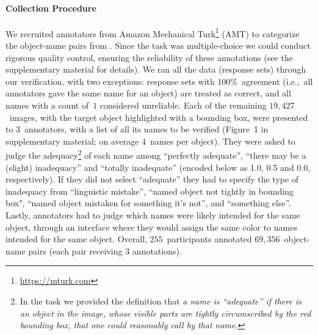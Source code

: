 \paragraph{Collection Procedure}
\label{sect:mn_verification}

We recruited annotators from Amazon Mechanical Turk\footnote{
	\url{https://mturk.com}
} (AMT) to categorize the object-name pairs from \mn.
Since the task was multiple-choice we could conduct rigorous quality control, ensuring the reliability of these annotations (see the supplementary material for details).
We ran all the \mn data (response sets) through our verification, with two exceptions: 
response sets with $100$\%~agreement (i.e.,~all annotators gave the same name for an object) are treated as correct, and all names with a count of~$1$ considered unreliable.
Each of the remaining $19,427$~images, with the target object highlighted with a bounding box, were presented to $3$~annotators, with a list of all its names to be verified (Figure~1 in supplementary material; on average $4$~names per object).
They were asked to judge the adequacy\footnote{
	In the task we provided the definition that \textit{a name is ``adequate'' if there is an object in the image, whose visible parts are tightly circumscribed by the red bounding box, that one could reasonably call by that name}.
} of each name among ``perfectly adequate'', ``there may be a (slight) inadequacy'' and ``totally inadequate'' (encoded below as 1.0, 0.5 and 0.0, respectively).
If they did not select ``adequate'' they had to specify the type of inadequacy from ``linguistic mistake'', ``named object not tightly in bounding box",  ``named object mistaken for something it's not'', and ``something else''.
Lastly, annotators had to judge which names were likely intended for the same object, through an interface where they would assign the same color to names intended for the same object.
Overall, $255$~participants annotated $69,356$~object-name pairs (each pair receiving 3 annotations).




